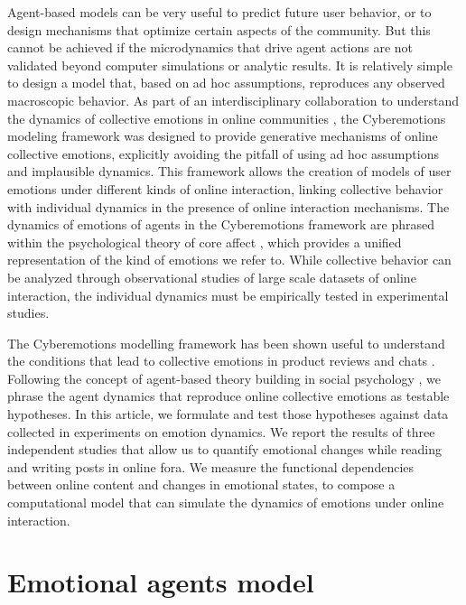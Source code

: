 \documentclass[nologo,url,11pt,a4paper]{ETHpaper}
\begin{document}
Agent-based models can be very useful to predict future user behavior, or to design mechanisms that optimize certain aspects of the community.  
But this cannot be achieved if the microdynamics that drive agent actions are not validated beyond computer simulations or analytic results. 
It is relatively simple to design a model that, based on ad hoc assumptions, reproduces any observed macroscopic behavior. 
As part of an interdisciplinary collaboration to understand the dynamics of collective emotions in online communities \cite{Ahn2011}, the Cyberemotions modeling framework \cite{Schweitzer2010} 
was designed to provide generative mechanisms of online collective emotions, explicitly 
avoiding the pitfall of using ad hoc assumptions and implausible dynamics.
This framework allows the creation of models of user emotions under different kinds of online interaction,  linking collective behavior with individual dynamics in the presence of online interaction mechanisms. 
The dynamics of emotions of agents in the Cyberemotions framework are phrased within the psychological theory of core affect \cite{Russell1980}, which provides a unified representation of the kind of emotions we refer to.
While collective behavior can be analyzed through observational studies of large scale datasets of online interaction, the individual dynamics must be empirically tested in experimental studies. 


The Cyberemotions modelling framework has been shown useful to understand the conditions that lead to collective emotions in product reviews \cite{Garcia2011} and chats \cite{Garas2012}.  
Following the concept of agent-based theory building in social psychology \cite{Smith2007}, we phrase the agent dynamics that reproduce online collective emotions \cite{Schweitzer2010} as testable hypotheses. 
In this article, we formulate and test those hypotheses against data collected in experiments on emotion dynamics.
We report the results of three independent studies that allow us to quantify emotional changes while reading and writing posts in online fora. 
We measure the functional dependencies between online content and changes in emotional states, to compose a computational model that can simulate the dynamics of emotions under online interaction.


\section{Emotional agents model}
\end{document}
